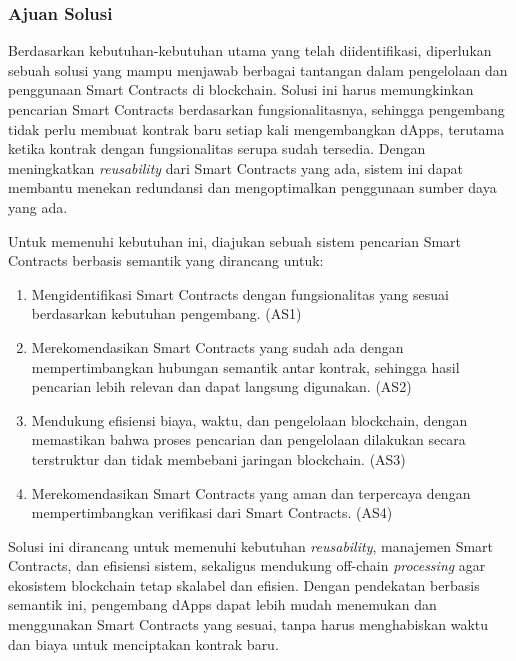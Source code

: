 \subsubsection{Ajuan Solusi}
\label{subsubsec:ajuan-solusi}

Berdasarkan kebutuhan-kebutuhan utama yang telah diidentifikasi, diperlukan sebuah solusi yang mampu menjawab berbagai tantangan dalam pengelolaan dan penggunaan Smart Contracts di blockchain. Solusi ini harus memungkinkan pencarian Smart Contracts berdasarkan fungsionalitasnya, sehingga pengembang tidak perlu membuat kontrak baru setiap kali mengembangkan dApps, terutama ketika kontrak dengan fungsionalitas serupa sudah tersedia. Dengan meningkatkan \textit{reusability} dari Smart Contracts yang ada, sistem ini dapat membantu menekan redundansi dan mengoptimalkan penggunaan sumber daya yang ada.

Untuk memenuhi kebutuhan ini, diajukan sebuah sistem pencarian Smart Contracts berbasis semantik yang dirancang untuk:

% 

\begin{enumerate}
	\item Mengidentifikasi Smart Contracts dengan fungsionalitas yang sesuai berdasarkan kebutuhan pengembang. (AS1)
	\item Merekomendasikan Smart Contracts yang sudah ada dengan mempertimbangkan hubungan semantik antar kontrak, sehingga hasil pencarian lebih relevan dan dapat langsung digunakan. (AS2)
	\item Mendukung efisiensi biaya, waktu, dan pengelolaan blockchain, dengan memastikan bahwa proses pencarian dan pengelolaan dilakukan secara terstruktur dan tidak membebani jaringan blockchain. (AS3)
	\item Merekomendasikan Smart Contracts yang aman dan terpercaya dengan mempertimbangkan verifikasi dari Smart Contracts. (AS4)
\end{enumerate}

Solusi ini dirancang untuk memenuhi kebutuhan \textit{reusability}, manajemen Smart Contracts, dan efisiensi sistem, sekaligus mendukung off-chain \textit{processing} agar ekosistem blockchain tetap skalabel dan efisien. Dengan pendekatan berbasis semantik ini, pengembang dApps dapat lebih mudah menemukan dan menggunakan Smart Contracts yang sesuai, tanpa harus menghabiskan waktu dan biaya untuk menciptakan kontrak baru.